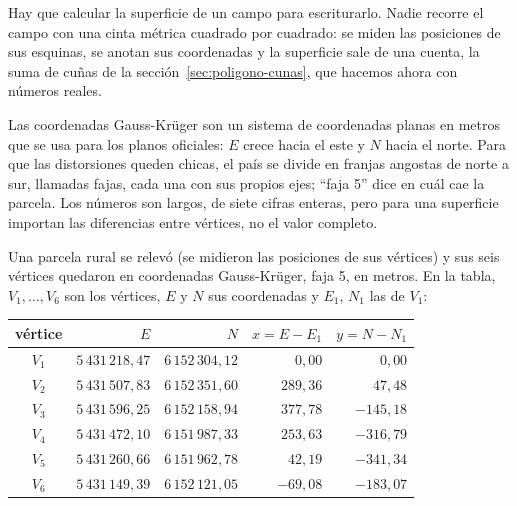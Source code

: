 Hay que calcular la superficie de un campo para escriturarlo. Nadie recorre el campo con una
cinta métrica cuadrado por cuadrado: se miden las posiciones de sus esquinas, se anotan sus
coordenadas y la superficie sale de una cuenta, la suma de cuñas de la
sección~\ref{sec:poligono-cunas}, que hacemos ahora con números reales.

\begin{idea}
Las coordenadas Gauss-Krüger son un sistema de coordenadas planas en metros que se usa para los
planos oficiales: \(E\) crece hacia el este y \(N\) hacia el norte. Para que las distorsiones
queden chicas, el país se divide en franjas angostas de norte a sur, llamadas fajas, cada una
con sus propios ejes; \enquote{faja 5} dice en cuál cae la parcela. Los números son largos,
de siete cifras enteras, pero para una superficie importan las diferencias entre vértices, no
el valor completo.
\end{idea}

Una parcela rural se relevó (se midieron las posiciones de sus vértices) y sus seis vértices
quedaron en coordenadas Gauss-Krüger, faja 5, en metros. En la tabla, \(V_1,\dots,V_6\) son
los vértices, \(E\) y \(N\) sus coordenadas y \(E_1\), \(N_1\) las de \(V_1\):

\begin{center}
\small
\begin{tabular}{crrrr}
\toprule
vértice & \(E\) & \(N\) & \(x=E-E_1\) & \(y=N-N_1\)\\
\midrule
\(V_1\) & \(5\,431\,218{,}47\) & \(6\,152\,304{,}12\) & \(0{,}00\) & \(0{,}00\)\\
\(V_2\) & \(5\,431\,507{,}83\) & \(6\,152\,351{,}60\) & \(289{,}36\) & \(47{,}48\)\\
\(V_3\) & \(5\,431\,596{,}25\) & \(6\,152\,158{,}94\) & \(377{,}78\) & \(-145{,}18\)\\
\(V_4\) & \(5\,431\,472{,}10\) & \(6\,151\,987{,}33\) & \(253{,}63\) & \(-316{,}79\)\\
\(V_5\) & \(5\,431\,260{,}66\) & \(6\,151\,962{,}78\) & \(42{,}19\) & \(-341{,}34\)\\
\(V_6\) & \(5\,431\,149{,}39\) & \(6\,152\,121{,}05\) & \(-69{,}08\) & \(-183{,}07\)\\
\bottomrule
\end{tabular}
\end{center}

